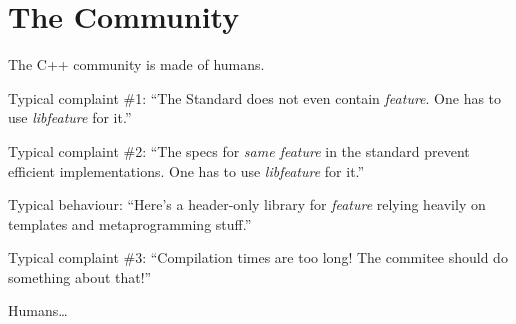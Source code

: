 \section{The Community}

The C++ community is made of humans.

Typical complaint \#1: ``The Standard does not even
  contain {\em feature}. One has to use {\em libfeature} for it.''

Typical complaint \#2: ``The specs for {\em same feature}
  in the standard prevent efficient implementations.  One has to use
  {\em libfeature} for it.''

Typical behaviour: ``Here's a header-only library for {\em
    feature} relying heavily on templates and metaprogramming
  stuff.''

Typical complaint \#3: ``Compilation times are too long!
  The commitee should do something about that!''

Humans…
